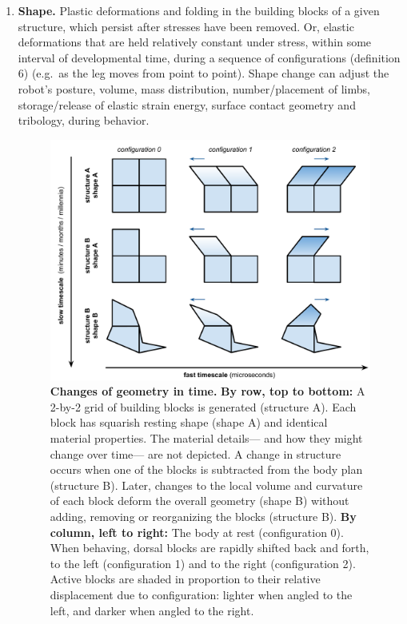 \begin{enumerate}
    
    \item \textbf{Shape.} Plastic deformations and folding in the building blocks of a given structure, which persist after stresses have been removed.
    Or, elastic deformations that are held relatively constant under stress, within some interval of developmental time, during a sequence of configurations (definition 6) (e.g.~as the leg moves from point to point).
    Shape change can adjust the robot's posture, volume, mass distribution, number/placement of limbs, storage/release of elastic strain energy, surface contact geometry and tribology, during behavior.
    
    \begin{figure}[H]
        \centering
        \vspace{-2pt}
        \includegraphics[width=0.9\linewidth]{fig/ontology.pdf}
        \caption{%
        \textbf{Changes of geometry in time.}
        \textbf{By row, top to bottom:}
        A 2-by-2 grid of building blocks is generated (structure A).
        Each block has squarish resting shape (shape A) and identical material properties.
        The material details---%
        and how they might change over time---%
        are not depicted.
        A change in structure occurs when one of the blocks is subtracted from the body plan (structure B).
        Later, changes to the local volume and curvature of each block deform the overall geometry (shape B) without adding, removing or reorganizing the blocks (structure B).
        \textbf{By column, left to right:}
        The body at rest (configuration 0).
        When behaving, dorsal blocks are rapidly shifted back and forth, to the left (configuration 1) and to the right (configuration 2).
        Active blocks are shaded in proportion to their relative displacement due to configuration: lighter when angled to the left, and darker when angled to the right.
        \label{fig:ontology}%
        }
    \end{figure}
    

\end{enumerate}
